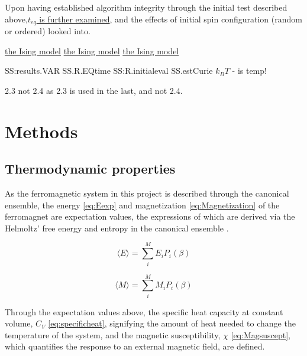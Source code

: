\documentclass[%
oneside,                 %
final,                   %
10pt]{article}
\begin{document}
Upon having established algorithm integrity through the initial test described above,\hyperref[SS:M.Eq.time]{$t_{eq}$ is further examined}, and the effects of initial spin configuration (random or ordered) looked into. 


\hyperref[SS:M.variance ]{the Ising model}
\hyperref[SS:M.Phase_trans]{the Ising model}
\hyperref[SS:Est.Curie]{the Ising model}

SS:results.VAR 
SS.R.EQtime 
SS:R.initialeval
SS.estCurie
$k_B T$ - is temp!


2.3 not 2.4 as 2.3 is used in the last, and not 2.4. 
\section{Methods}

\subsection{Thermodynamic properties}
\label{SS:thermodynamic.properties}	
As the ferromagnetic system in this project is described through the 
canonical ensemble, the energy \eqref{eq:Eexp} and magnetization \eqref{eq:Magnetization} of the ferromagnet are expectation values, the expressions of which are derived via the Helmoltz' free energy and entropy in the canonical ensemble \cite{HJ-SP}. 


\begin{equation}
\langle E \rangle = \sum_i^M E_i P_i (\beta)
\label{eq:Eexp}
\end{equation}

\begin{equation}
\langle M \rangle=\sum_i^M M_i P_i (\beta)
\label{eq:Magnetization}
\end{equation}

Through the expectation values above, the specific heat capacity at constant volume, $C_V$ \eqref{eq:specificheat}, signifying the amount of heat needed to change the temperature of the system, and the magnetic susceptibility, $\chi$ \eqref{eq:Magsuscept}, which quantifies the response to an external magnetic field, are defined. 
\end{document}
